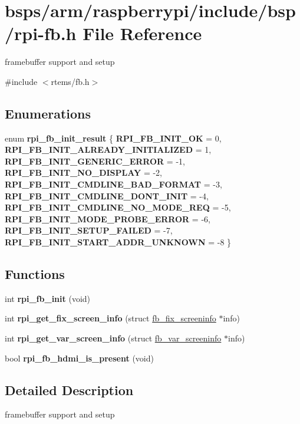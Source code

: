 \hypertarget{rpi-fb_8h}{}\section{bsps/arm/raspberrypi/include/bsp/rpi-\/fb.h File Reference}
\label{rpi-fb_8h}


framebuffer support and setup  


{\ttfamily \#include $<$rtems/fb.\+h$>$}\newline
\subsection*{Enumerations}
\begin{DoxyCompactItemize}
\item 
\mbox{\label{group__raspberrypi__fb_gad943f8078ec2ef7e8783fdcc08126f0c}} 
enum {\bfseries rpi\+\_\+fb\+\_\+init\+\_\+result} \{ \newline
{\bfseries R\+P\+I\+\_\+\+F\+B\+\_\+\+I\+N\+I\+T\+\_\+\+OK} = 0, 
{\bfseries R\+P\+I\+\_\+\+F\+B\+\_\+\+I\+N\+I\+T\+\_\+\+A\+L\+R\+E\+A\+D\+Y\+\_\+\+I\+N\+I\+T\+I\+A\+L\+I\+Z\+ED} = 1, 
{\bfseries R\+P\+I\+\_\+\+F\+B\+\_\+\+I\+N\+I\+T\+\_\+\+G\+E\+N\+E\+R\+I\+C\+\_\+\+E\+R\+R\+OR} = -\/1, 
{\bfseries R\+P\+I\+\_\+\+F\+B\+\_\+\+I\+N\+I\+T\+\_\+\+N\+O\+\_\+\+D\+I\+S\+P\+L\+AY} = -\/2, 
\newline
{\bfseries R\+P\+I\+\_\+\+F\+B\+\_\+\+I\+N\+I\+T\+\_\+\+C\+M\+D\+L\+I\+N\+E\+\_\+\+B\+A\+D\+\_\+\+F\+O\+R\+M\+AT} = -\/3, 
{\bfseries R\+P\+I\+\_\+\+F\+B\+\_\+\+I\+N\+I\+T\+\_\+\+C\+M\+D\+L\+I\+N\+E\+\_\+\+D\+O\+N\+T\+\_\+\+I\+N\+IT} = -\/4, 
{\bfseries R\+P\+I\+\_\+\+F\+B\+\_\+\+I\+N\+I\+T\+\_\+\+C\+M\+D\+L\+I\+N\+E\+\_\+\+N\+O\+\_\+\+M\+O\+D\+E\+\_\+\+R\+EQ} = -\/5, 
{\bfseries R\+P\+I\+\_\+\+F\+B\+\_\+\+I\+N\+I\+T\+\_\+\+M\+O\+D\+E\+\_\+\+P\+R\+O\+B\+E\+\_\+\+E\+R\+R\+OR} = -\/6, 
\newline
{\bfseries R\+P\+I\+\_\+\+F\+B\+\_\+\+I\+N\+I\+T\+\_\+\+S\+E\+T\+U\+P\+\_\+\+F\+A\+I\+L\+ED} = -\/7, 
{\bfseries R\+P\+I\+\_\+\+F\+B\+\_\+\+I\+N\+I\+T\+\_\+\+S\+T\+A\+R\+T\+\_\+\+A\+D\+D\+R\+\_\+\+U\+N\+K\+N\+O\+WN} = -\/8
 \}
\end{DoxyCompactItemize}
\subsection*{Functions}
\begin{DoxyCompactItemize}
\item 
int {\bfseries rpi\+\_\+fb\+\_\+init} (void)
\item 
int {\bfseries rpi\+\_\+get\+\_\+fix\+\_\+screen\+\_\+info} (struct \mbox{\hyperlink{structfb__fix__screeninfo}{fb\+\_\+fix\+\_\+screeninfo}} $\ast$info)
\item 
int {\bfseries rpi\+\_\+get\+\_\+var\+\_\+screen\+\_\+info} (struct \mbox{\hyperlink{structfb__var__screeninfo}{fb\+\_\+var\+\_\+screeninfo}} $\ast$info)
\item 
bool {\bfseries rpi\+\_\+fb\+\_\+hdmi\+\_\+is\+\_\+present} (void)
\end{DoxyCompactItemize}


\subsection{Detailed Description}
framebuffer support and setup 

